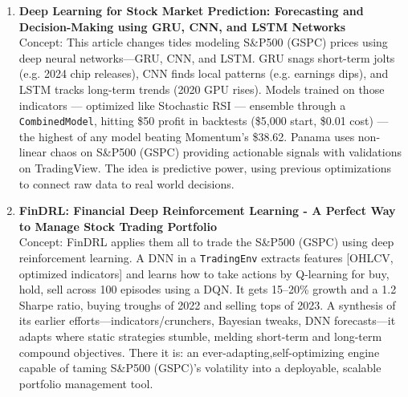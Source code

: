 \begin{enumerate}
    \item \textbf{Deep Learning for Stock Market Prediction: Forecasting and Decision-Making using GRU, CNN, and LSTM Networks} \\
    Concept: This article changes tides modeling S\&P500 (GSPC) prices using deep neural networks—GRU, CNN, and LSTM. GRU snags short-term jolts (e.g. 2024 chip releases), CNN finds local patterns (e.g. earnings dips), and LSTM tracks long-term trends (2020 GPU rises). Models trained on those indicators — optimized like Stochastic RSI — ensemble through a \texttt{CombinedModel}, hitting \$50 profit in backtests (\$5,000 start, \$0.01 cost) — the highest of any model beating Momentum’s \$38.62. Panama uses non-linear chaos on S\&P500 (GSPC) providing actionable signals with validations on TradingView. The idea is predictive power, using previous optimizations to connect raw data to real world decisions.
    
    \item \textbf{FinDRL: Financial Deep Reinforcement Learning - A Perfect Way to Manage Stock Trading Portfolio} \\
    Concept: FinDRL applies them all to trade the S\&P500 (GSPC) using deep reinforcement learning. A DNN in a \texttt{TradingEnv} extracts features [OHLCV, optimized indicators] and learns how to take actions by Q-learning for buy, hold, sell across 100 episodes using a DQN. It gets 15–20\% growth and a 1.2 Sharpe ratio, buying troughs of 2022 and selling tops of 2023. A synthesis of its earlier efforts—indicators/crunchers, Bayesian tweaks, DNN forecasts—it adapts where static strategies stumble, melding short-term and long-term compound objectives. There it is: an ever-adapting,self-optimizing engine capable of taming S\&P500 (GSPC)'s volatility into a deployable, scalable portfolio management tool.
    
\end{enumerate}